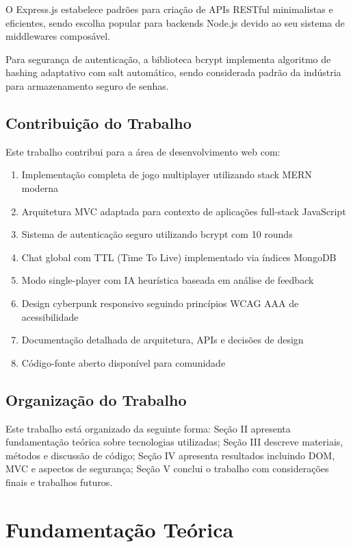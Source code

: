 \documentclass[conference]{IEEEtran}
\begin{document}
O Express.js \cite{express:2024} estabelece padrões para criação de APIs RESTful minimalistas e eficientes, sendo escolha popular para backends Node.js devido ao seu sistema de middlewares composável.

Para segurança de autenticação, a biblioteca bcrypt \cite{bcrypt:2024} implementa algoritmo de hashing adaptativo com salt automático, sendo considerada padrão da indústria para armazenamento seguro de senhas.

\subsection{Contribuição do Trabalho}
Este trabalho contribui para a área de desenvolvimento web com:

\begin{enumerate}
\item Implementação completa de jogo multiplayer utilizando stack MERN moderna
\item Arquitetura MVC adaptada para contexto de aplicações full-stack JavaScript
\item Sistema de autenticação seguro utilizando bcrypt com 10 rounds
\item Chat global com TTL (Time To Live) implementado via índices MongoDB
\item Modo single-player com IA heurística baseada em análise de feedback
\item Design cyberpunk responsivo seguindo princípios WCAG AAA de acessibilidade
\item Documentação detalhada de arquitetura, APIs e decisões de design
\item Código-fonte aberto disponível para comunidade
\end{enumerate}

\subsection{Organização do Trabalho}
Este trabalho está organizado da seguinte forma: Seção II apresenta fundamentação teórica sobre tecnologias utilizadas; Seção III descreve materiais, métodos e discussão de código; Seção IV apresenta resultados incluindo DOM, MVC e aspectos de segurança; Seção V conclui o trabalho com considerações finais e trabalhos futuros.

\section{Fundamentação Teórica}
\end{document}
